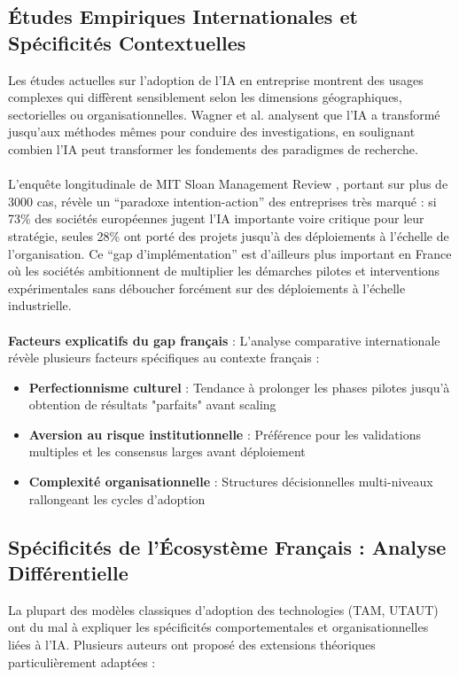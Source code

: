 \subsection{Études Empiriques Internationales et Spécificités Contextuelles}

Les études actuelles sur l’adoption de l’IA en entreprise montrent des usages complexes qui diffèrent sensiblement selon les dimensions géographiques, sectorielles ou organisationnelles. Wagner et al. \cite{wagner2022artificial} analysent que l’IA a transformé jusqu’aux méthodes mêmes pour conduire des investigations, en soulignant combien l’IA peut transformer les fondements des paradigmes de recherche.
\\\\
L’enquête longitudinale de MIT Sloan Management Review \cite{ransbotham2023expanding}, portant sur plus de 3000 cas, révèle un “paradoxe intention-action” des entreprises très marqué : si 73\% des sociétés européennes jugent l’IA importante voire critique pour leur stratégie, seules 28\% ont porté des projets jusqu’à des déploiements à l’échelle de l’organisation. Ce “gap d’implémentation” est d’ailleurs plus important en France où les sociétés ambitionnent de multiplier les démarches pilotes et interventions expérimentales sans déboucher forcément sur des déploiements à l’échelle industrielle.
\\\\
\textbf{Facteurs explicatifs du gap français} : L'analyse comparative internationale révèle plusieurs facteurs spécifiques au contexte français :
\begin{itemize}
    \item \textbf{Perfectionnisme culturel} : Tendance à prolonger les phases pilotes jusqu'à obtention de résultats "parfaits" avant scaling
    \item \textbf{Aversion au risque institutionnelle} : Préférence pour les validations multiples et les consensus larges avant déploiement
    \item \textbf{Complexité organisationnelle} : Structures décisionnelles multi-niveaux rallongeant les cycles d'adoption
\end{itemize}

\subsection{Spécificités de l'Écosystème Français : Analyse Différentielle}

La plupart des modèles classiques d’adoption des technologies (TAM, UTAUT) ont du mal à expliquer les spécificités comportementales et organisationnelles liées à l’IA. Plusieurs auteurs ont proposé des extensions théoriques particulièrement adaptées :

